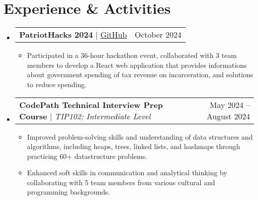 \documentclass[letterpaper,11pt]{article}
\makeatletter
\newcommand{\resumeItem}[1]{
  \item\small{
    {#1 \vspace{-5pt}}
  }
}
\newcommand{\resumeSubheading}[4]{
  \vspace{-2pt}\item
    \begin{tabular*}{0.97\textwidth}[t]{l@{\extracolsep{\fill}}r@{\hspace{-0.2in}}}
        \textbf{#1} & #2 \\
        \textit{\small#3} & \textit{\small #4} \\
    \end{tabular*}\vspace{-7pt}
}
\newcommand{\resumeProjectHeading}[2]{
    \item
    \begin{tabular*}{0.97\textwidth}{l@{\extracolsep{\fill}}r@{\hspace{-0.2in}}}
        \small#1 & #2 \\
    \end{tabular*}\vspace{-7pt}
}
\newcommand{\resumeSubHeadingListStart}{\begin{itemize}[leftmargin=0.00in, rightmargin=-0.2in, label={}]}
\newcommand{\resumeSubHeadingListEnd}{\end{itemize}}
\newcommand{\resumeItemListStart}{\begin{itemize}[leftmargin=0.15in, rightmargin=0.15in]}
\newcommand{\resumeItemListEnd}{\end{itemize}\vspace{-7pt}}
\makeatother
\begin{document}



\section{Experience \& Activities}
    \vspace{-3pt}
    \resumeSubHeadingListStart
        \resumeProjectHeading
            {\textbf{PatriotHacks 2024} $|$ \href{https://github.com/juhun32/Prison-Break}{\underline{GitHub}}}{October 2024}
            \resumeItemListStart
                \resumeItem{Participated in a 36-hour hackathon event, collaborated with 3 team members to develop a React web application that provides informations about government spending of tax revenue on incarceration, and solutions to reduce spending.}
                \resumeItemListEnd
        \resumeSubHeadingListEnd

    \resumeSubHeadingListStart
        \resumeProjectHeading
            {\textbf{CodePath Technical Interview Prep Course} $|$ \emph{TIP102; Intermediate Level}}{May 2024 -- August 2024}
            \resumeItemListStart
                \resumeItem{Improved problem-solving skills and understanding of data structures and algorithms, including heaps, trees, linked lists, and hashmaps through practicing 60+ datastructure problems.}
                \resumeItem{Enhanced soft skills in communication and analytical thinking by collaborating with 5 team members from various cultural and programming backgrounds.}
                \resumeItemListEnd
        \resumeSubHeadingListEnd
\end{document}
